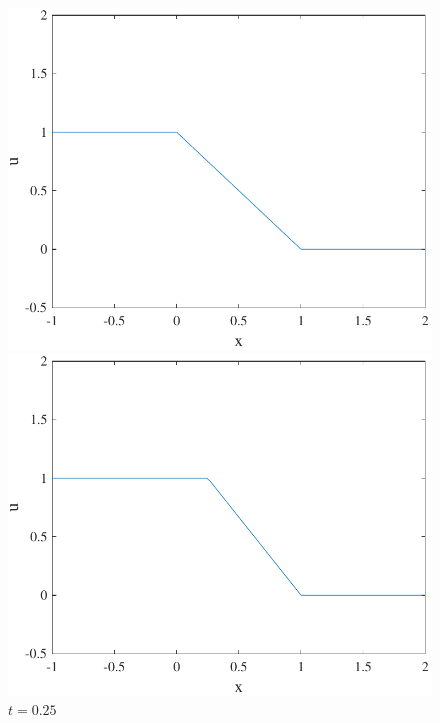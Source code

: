 \documentclass{article}
\begin{document}
\begin{figure}[H]
  \centering
  \begin{minipage}[b]{0.49\textwidth}
    \includegraphics[width=\textwidth]{hw_14_plot5.pdf}
    \caption{$t = 0$}

  \end{minipage}
  \hfill
  \begin{minipage}[b]{0.49\textwidth}
    \includegraphics[width=\textwidth]{hw_14_plot6.pdf}
    \caption{$t = 0.25$}


\end{minipage}
\end{figure}
\end{document}
